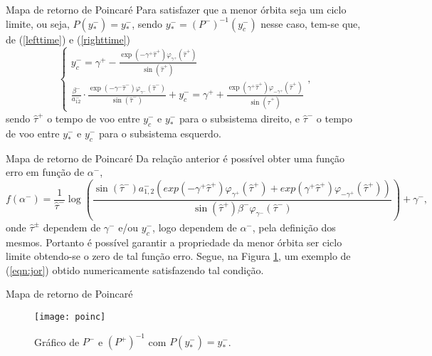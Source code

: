 \documentclass[aspectratio=169]{beamer}
\begin{document}
\begin{frame}{Mapa de retorno de Poincaré}
    Para satisfazer que a menor órbita seja um ciclo limite, ou seja, $P(y^-_*)=y^-_*$, sendo $y^-_*=(P^-)^{-1}(y^-_c)$ nesse caso, tem-se que, de (\ref{lefttime}) e (\ref{righttime})
$$
\left\{\begin{array}{l}
y_{c}^{-}=\gamma^{+}-\frac{\exp \left(-\gamma^{+} \hat{\tau}^{+}\right)  \varphi_{\gamma^{+}}\left(\hat{\tau}^{+}\right)}{\sin \left(\hat{\tau}^{+}\right)} \\
\frac{\beta^{-}}{a_{12}^{-}} \cdot \frac{\exp \left(-\gamma^{-} \hat{\tau}^{-}\right)  \varphi_{\gamma^{-}}\left(\hat{\tau}^{-}\right)}{\sin (\hat{\tau}^{-})}+y_{c}^{-}=\gamma^{+}+\frac{\exp \left(\gamma^{+} \hat{\tau}^{+}\right)  \varphi_{-\gamma^{+}}\left(\hat{\tau}^{+}\right)}{\sin \left(\hat{\tau}^{+}\right)}
\end{array}\right.,
$$\pause
sendo $\hat{\tau}^{+}$ o tempo de voo entre $y_c^-$ e  $y^-_*$ para o subsistema direito, e $\hat{\tau}^{-}$ o tempo de voo entre $y^-_*$ e $y_c^-$ para o subsistema esquerdo.
\end{frame}

\begin{frame}{Mapa de retorno de Poincaré}
    Da relação anterior é possível obter uma função erro em função de $\alpha^-$,
\begin{equation}
\label{zero}
f\left( \alpha^-\right)=\frac{1}{\hat{\tau}^-} \log\left(\frac{\sin(\hat{\tau}^-)a^-_{1,2}\left(exp(-\gamma^+\hat{\tau}^+)\varphi_{\gamma^{+}}\left(\hat{\tau}^{+}\right)+exp(\gamma^+\hat{\tau}^+)\varphi_{-\gamma^{+}}\left(\hat{\tau}^{+}\right)\right)}{\sin(\hat{\tau}^+)\beta^-\varphi_{\gamma^{-}}\left(\hat{\tau}^{-}\right)}\right)+\gamma^-,
\end{equation}\pause
onde $\hat{\tau}^\pm$ dependem de $\gamma^-$ e/ou $y_c^-$, logo dependem de $\alpha^-$, pela definição dos mesmos. Portanto é possível garantir a propriedade da menor órbita ser ciclo limite obtendo-se o zero de tal função erro. Segue, na Figura \ref{igua}, um exemplo de (\ref{eqn:jor}) obtido numericamente satisfazendo tal condição.
\end{frame}

\begin{frame}{Mapa de retorno de Poincaré}
    \begin{figure}[H]
\centering
\texttt{[image: poinc]}\\
\vspace{\baselineskip}
\caption{\label{igua}Gráfico de $P^-$ e $(P^+)^{-1}$ com $P(y^-_*)=y^-_*$.}
\end{figure}
\end{frame}
\end{document}
